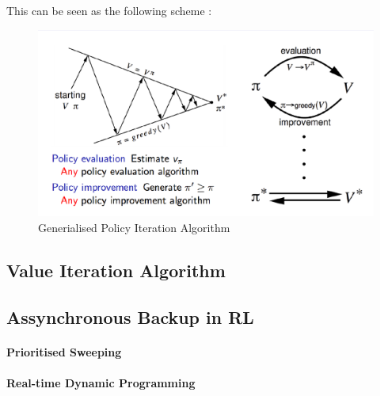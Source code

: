 		This can be seen as the following scheme : 

		\begin{figure}[ht]
			\centering
			\includegraphics[scale=0.5]{figures/GenPolicyIteration}
			\caption{Generialised Policy Iteration Algorithm}
		\end{figure}

	\subsection{Value Iteration Algorithm} %
		\label{sub:value_iteration_algorithm}
	

	\subsection{Assynchronous Backup in RL} %
		\label{sub:assynchronous_backup_in_rl}
		
		\paragraph{Prioritised Sweeping} %
			\label{par:prioritised_sweeping}
		

		\paragraph{Real-time Dynamic Programming} %
			\label{par:real_time_dynamic_programming}
		

	
